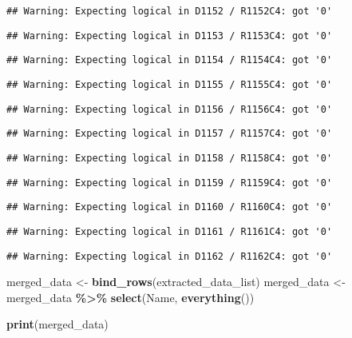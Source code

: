 \documentclass[
]{article}
\newenvironment{Shaded}{\begin{snugshade}}{\end{snugshade}}
\newcommand{\FunctionTok}[1]{\textcolor[rgb]{0.13,0.29,0.53}{\textbf{#1}}}
\newcommand{\NormalTok}[1]{#1}
\newcommand{\OtherTok}[1]{\textcolor[rgb]{0.56,0.35,0.01}{#1}}
\newcommand{\SpecialCharTok}[1]{\textcolor[rgb]{0.81,0.36,0.00}{\textbf{#1}}}
\begin{document}
\begin{verbatim}
## Warning: Expecting logical in D1152 / R1152C4: got '0'
\end{verbatim}

\begin{verbatim}
## Warning: Expecting logical in D1153 / R1153C4: got '0'
\end{verbatim}

\begin{verbatim}
## Warning: Expecting logical in D1154 / R1154C4: got '0'
\end{verbatim}

\begin{verbatim}
## Warning: Expecting logical in D1155 / R1155C4: got '0'
\end{verbatim}

\begin{verbatim}
## Warning: Expecting logical in D1156 / R1156C4: got '0'
\end{verbatim}

\begin{verbatim}
## Warning: Expecting logical in D1157 / R1157C4: got '0'
\end{verbatim}

\begin{verbatim}
## Warning: Expecting logical in D1158 / R1158C4: got '0'
\end{verbatim}

\begin{verbatim}
## Warning: Expecting logical in D1159 / R1159C4: got '0'
\end{verbatim}

\begin{verbatim}
## Warning: Expecting logical in D1160 / R1160C4: got '0'
\end{verbatim}

\begin{verbatim}
## Warning: Expecting logical in D1161 / R1161C4: got '0'
\end{verbatim}

\begin{verbatim}
## Warning: Expecting logical in D1162 / R1162C4: got '0'
\end{verbatim}

\begin{Shaded}
\begin{Highlighting}[]
\NormalTok{merged\_data }\OtherTok{\textless{}{-}} \FunctionTok{bind\_rows}\NormalTok{(extracted\_data\_list)}
\NormalTok{merged\_data }\OtherTok{\textless{}{-}}\NormalTok{ merged\_data }\SpecialCharTok{\%\textgreater{}\%} \FunctionTok{select}\NormalTok{(Name, }\FunctionTok{everything}\NormalTok{())}

\FunctionTok{print}\NormalTok{(merged\_data)}
\end{Highlighting}
\end{Shaded}
\end{document}

